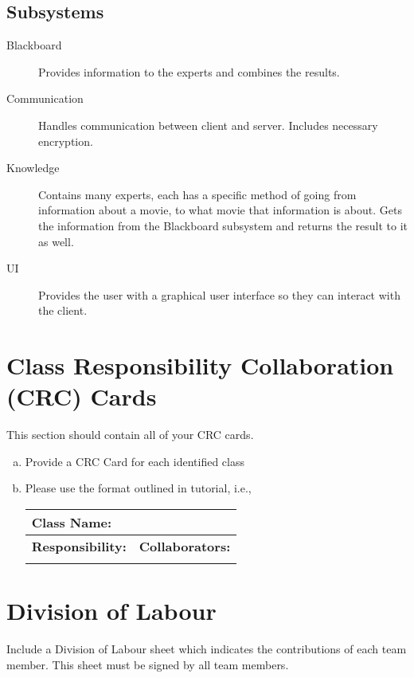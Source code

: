 \documentclass[]{article}
\begin{document}
\subsection{Subsystems}
\label{sub:subsystems}
\begin{description}
	\item[Blackboard] Provides information to the experts and combines the results.
	\item[Communication] Handles communication between client and server. Includes necessary encryption.
	\item[Knowledge] Contains many experts, each has a specific method of going from information about a movie, to what movie that information is about. Gets the information from the Blackboard subsystem and returns the result to it as well.
	\item[UI] Provides the user with a graphical user interface so they can interact with the client.
\end{description}

	
\section{Class Responsibility Collaboration (CRC) Cards}
\label{sec:class_responsibility_collaboration_crc_cards}
This section should contain all of your CRC cards.

\begin{enumerate}[a)]
	\item Provide a CRC Card for each identified class
	\item Please use the format outlined in tutorial, i.e., 
	\begin{table}[ht]
		\centering
		\begin{tabular}{|p{5cm}|p{5cm}|}
		\hline 
		 \multicolumn{2}{|l|}{\textbf{Class Name:}} \\
		\hline
		\textbf{Responsibility:} & \textbf{Collaborators:} \\
		\hline
		\vspace{1in} & \\
		\hline
		\end{tabular}
	\end{table}
	
\end{enumerate}

\appendix
\section{Division of Labour}
\label{sec:division_of_labour}
Include a Division of Labour sheet which indicates the contributions of each team member. This sheet must be signed by all team members.
\end{document}
